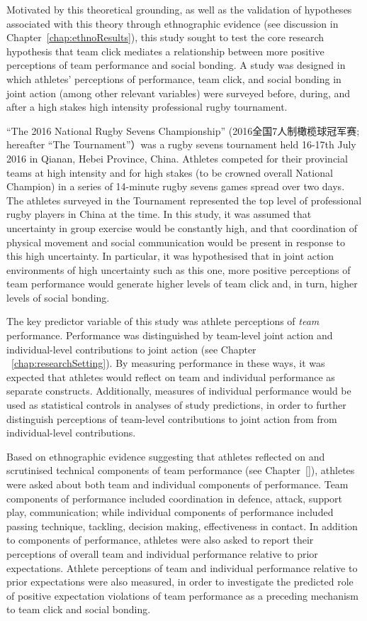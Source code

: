 \begin{CJK}{UTF8}{gbsn}
Motivated by this theoretical grounding, as well as the validation of hypotheses associated with this theory through ethnographic evidence  (see discussion in Chapter~\ref{chap:ethnoResults}),  this study sought to test the core research hypothesis that team click mediates a relationship between more positive perceptions of team performance and social bonding.  A study was designed in which athletes’ perceptions of performance, team click, and social bonding in joint action (among other relevant variables) were surveyed before, during, and after a high stakes high intensity professional rugby tournament.

``The 2016 National Rugby Sevens Championship'' (2016全国7人制橄榄球冠军赛; hereafter ``The Tournament''）was a rugby sevens tournament held 16-17th July 2016 in Qianan, Hebei Province, China.  Athletes competed for their provincial teams at high intensity and for high stakes (to be crowned overall National Champion) in a series of 14-minute rugby sevens games spread over two days.  The athletes surveyed in the Tournament represented the top level of professional rugby players in China at the time.  In this study, it was assumed that uncertainty in group exercise would be constantly high, and that coordination of physical movement and social communication would be present in response to this high uncertainty.  In particular, it was hypothesised that in joint action environments of high uncertainty such as this one, more positive perceptions of team performance would generate higher levels of team click and, in turn, higher levels of social bonding.

The key predictor variable of this study was athlete perceptions of \textit{team} performance.  Performance was distinguished by team-level joint action and individual-level contributions to joint action (see Chapter ~\ref{chap:researchSetting}).  By measuring performance in these ways, it was expected that athletes would reflect on team and individual performance as separate constructs.  Additionally, measures of individual performance would be used as statistical controls in analyses of study predictions, in order to further distinguish perceptions of team-level contributions to joint action from from individual-level contributions.

 Based on ethnographic evidence suggesting that athletes reflected on and scrutinised technical components of team performance (see Chapter~\ref{}), athletes were asked about both team and individual components of performance.  Team components of performance included coordination in defence, attack, support play, communication; while individual components of performance included passing technique, tackling, decision making, effectiveness in contact.  In addition to components of performance, athletes were also asked to report their perceptions of overall team and individual performance relative to prior expectations.  Athlete perceptions of team and individual performance relative to prior expectations were also measured, in order to investigate the predicted role of positive expectation violations of team performance as a preceding mechanism to team click and social bonding.


\end{CJK}
